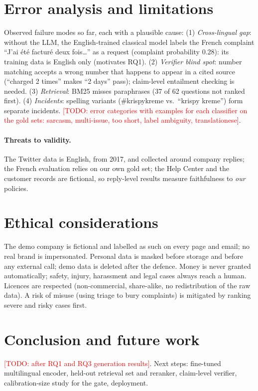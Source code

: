\documentclass[11pt,a4paper]{article}
\newcommand{\todo}[1]{\textcolor{red}{[TODO: #1]}}
\begin{document}
\section{Error analysis and limitations}
Observed failure modes so far, each with a plausible cause:
(1) \emph{Cross-lingual gap}: without the LLM, the English-trained classical model labels the French
complaint ``J'ai été facturé deux fois\dots'' as a request (complaint probability 0.28): its training
data is English only (motivates RQ1).
(2) \emph{Verifier blind spot}: number matching accepts a wrong number that happens to appear in a
cited source (``charged 2 times'' makes ``2 days'' pass); claim-level entailment checking is needed.
(3) \emph{Retrieval}: BM25 misses paraphrases (37 of 62 questions not ranked first).
(4) \emph{Incidents}: spelling variants (\#krispykreme vs.\ ``krispy kreme'') form separate incidents.
\todo{error categories with examples for each classifier on the gold sets: sarcasm, multi-issue,
too short, label ambiguity, translationese}.

\paragraph{Threats to validity.} The Twitter data is English, from 2017, and collected around company
replies; the French evaluation relies on our own gold set; the Help Center and the customer records
are fictional, so reply-level results measure faithfulness to \emph{our} policies.

\section{Ethical considerations}
The demo company is fictional and labelled as such on every page and email; no real brand is
impersonated. Personal data is masked before storage and before any external call; demo data is
deleted after the defence. Money is never granted automatically; safety, injury, harassment and
legal cases always reach a human. Licences are respected (non-commercial, share-alike, no
redistribution of the raw data). A risk of misuse (using triage to bury complaints) is mitigated by
ranking severe and risky cases first.

\section{Conclusion and future work}
\todo{after RQ1 and RQ3 generation results}. Next steps: fine-tuned multilingual encoder, held-out
retrieval set and reranker, claim-level verifier, calibration-size study for the gate, deployment.
\end{document}
